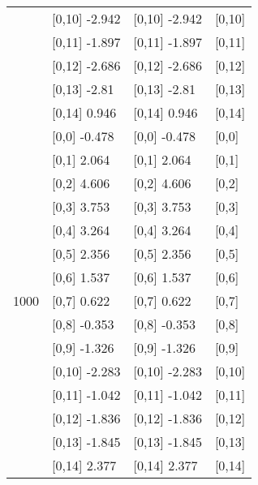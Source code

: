 \begin{table}
\begin{tabular}[t]{llll}
\addlinespace
 & {}[0,10] -2.942 & {}[0,10] -2.942 & {}[0,10]\\
 & {}[0,11] -1.897 & {}[0,11] -1.897 & {}[0,11]\\
 & {}[0,12] -2.686 & {}[0,12] -2.686 & {}[0,12]\\
 & {}[0,13] -2.81 & {}[0,13] -2.81 & {}[0,13]\\
 & {}[0,14] 0.946 & {}[0,14] 0.946 & {}[0,14]\\
\addlinespace
 & {}[0,0] -0.478 & {}[0,0] -0.478 & {}[0,0]\\
 & {}[0,1] 2.064 & {}[0,1] 2.064 & {}[0,1]\\
 & {}[0,2] 4.606 & {}[0,2] 4.606 & {}[0,2]\\
 & {}[0,3] 3.753 & {}[0,3] 3.753 & {}[0,3]\\
 & {}[0,4] 3.264 & {}[0,4] 3.264 & {}[0,4]\\
\addlinespace
 & {}[0,5] 2.356 & {}[0,5] 2.356 & {}[0,5]\\
 & {}[0,6] 1.537 & {}[0,6] 1.537 & {}[0,6]\\
1000 & {}[0,7] 0.622 & {}[0,7] 0.622 & {}[0,7]\\
 & {}[0,8] -0.353 & {}[0,8] -0.353 & {}[0,8]\\
 & {}[0,9] -1.326 & {}[0,9] -1.326 & {}[0,9]\\
\addlinespace
 & {}[0,10] -2.283 & {}[0,10] -2.283 & {}[0,10]\\
 & {}[0,11] -1.042 & {}[0,11] -1.042 & {}[0,11]\\
 & {}[0,12] -1.836 & {}[0,12] -1.836 & {}[0,12]\\
 & {}[0,13] -1.845 & {}[0,13] -1.845 & {}[0,13]\\
 & {}[0,14] 2.377 & {}[0,14] 2.377 & {}[0,14]\\
\bottomrule
\end{tabular}
\end{table}
